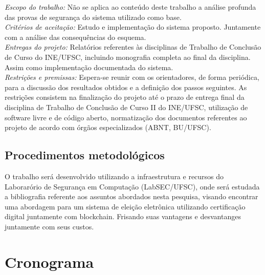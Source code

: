 \documentclass{ufsctex/ufsctex}
\begin{document}
\noindent \emph{Escopo do trabalho:} Não se aplica ao conteúdo deste trabalho
a análise profunda das provas de segurança do sistema utilizado como base.
\\

\noindent \emph{Critérios de aceitação:} Estudo e implementação do sistema
proposto. Juntamente com a análise das consequências do esquema.
\\

\noindent \emph{Entregas do projeto:} Relatórios referentes às disciplinas 
de Trabalho de Conclusão de Curso do INE/UFSC, incluindo monografia completa
ao final da disciplina. Assim como implementação documentada do sistema.
\\

\noindent \emph{Restrições e premissas:}  Espera-se reunir com os orientadores,
de forma periódica, para a discussão dos resultados obtidos e a definição dos
passos seguintes. As restrições consistem na finalização do projeto até o prazo
de entrega final da disciplina de Trabalho de Conclusão de Curso II do
INE/UFSC, utilização de software livre e de código aberto, normatização dos
documentos referentes ao projeto de acordo com órgãos especializados (ABNT,
BU/UFSC).

\section{Procedimentos metodológicos}

O trabalho será desenvolvido utilizando a infraestrutura e recursos do
Laborarório de Segurança em Computação (LabSEC/UFSC), onde será estudada
a bibliografia referente aos assuntos abordados nesta pesquisa, visando
encontrar uma abordagem para um sistema de eleição eletrônica utilizando
certificação digital juntamente com blockchain. Frisando suas vantagens e
desvantanges juntamente com seus custos.

\chapter{Cronograma}
\end{document}
